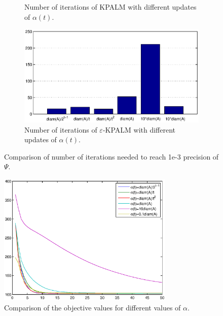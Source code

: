 \documentclass[12pt]{article}
\numberwithin{equation}{section}
\begin{document}
\begin{figure}
\begin{subfigure}[b]{0.7\textwidth}
        \caption{Number of iterations of KPALM with different updates of $\alpha(t)$.}
        \label{fig:iters_dyn_alpha_kpalm_comp}
    \end{subfigure}
    \begin{subfigure}[b]{0.7\textwidth}
        \includegraphics[width=\textwidth]{iterations_dynamic_alpha_eps_kpalm_comparison}
        \caption{Number of iterations of $\varepsilon$-KPALM with different updates of $\alpha(t)$.}
        \label{fig:iters_dyn_alpha_eps_kpalm_comp}
    \end{subfigure}
    \caption{Comparison of number of iterations needed to reach 1e-3 precision of $\Psi$.}\label{fig:iters_comp}
\end{figure}

\begin{figure}
    \centering
    \includegraphics[width=0.75\textwidth]{dynamic_alpha_eps_kpalm}
    \caption{Comparison of the objective values for different values of $\alpha$.}
    \label{fig:dynamic_alpha_eps_psi_comp}
\end{figure}
\end{document}

